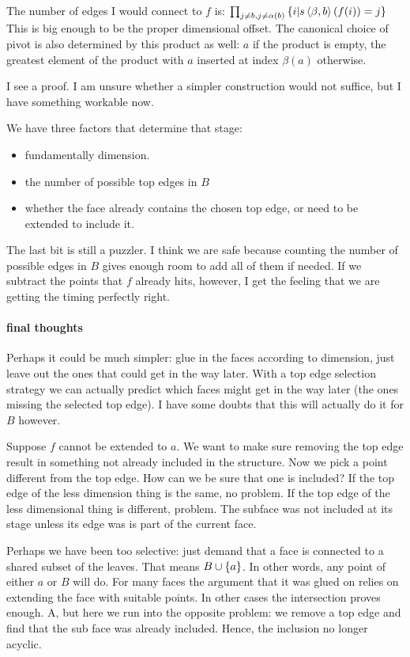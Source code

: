 \documentclass[csh.tex]{subfiles}
\begin{document}
The number of edges I would connect to $f$ is:
$\prod_{j\neq b, j\neq \alpha(b)}\left\{i|s\left\langle \beta,b \right\rangle(f(i)) = j\right\}$
This is big enough to be the proper dimensional offset.
The canonical choice of pivot is also determined by this product as well: $a$ if the product is empty, the greatest element of the product with $a$ inserted at index $\beta(a)$ otherwise.

I see a proof. I am unsure whether a simpler construction would not suffice, but I have something workable now.

We have three factors that determine that stage:
\begin{itemize}
\item fundamentally dimension.
\item the number of possible top edges in $B$
\item whether the face already contains the chosen top edge, or need to be extended to include it.
\end{itemize}
The last bit is still a puzzler. I think we are safe because counting the number of possible edges in $B$ gives enough room to add all of them if needed. If we subtract the points that $f$ already hits, however, I get the feeling that we are getting the timing perfectly right.

\paragraph{final thoughts}
Perhaps it could be much simpler: glue in the faces according to dimension, just leave out the ones that could get in the way later. With a top edge selection strategy we can actually predict which faces might get in the way later (the ones missing the selected top edge). I have some doubts that this will actually do it for $B$ however.

Suppose $f$ cannot be extended to $a$. We want to make sure removing the top edge result in something not already included in the structure. 
Now we pick a point different from the top edge. How can we be sure that one is included? If the top edge of the less dimension thing is the same, no problem. If the top edge of the less dimensional thing is different, problem. The subface was not included at its stage unless its edge was is part of the current face.

Perhaps we have been too selective: just demand that a face is connected to a shared subset of the leaves. That means $B\cup\left\{a\right\}$. In other words, any point of either $a$ or $B$ will do. For many faces the argument that it was glued on relies on extending the face with suitable points. In other cases the intersection proves enough. A, but here we run into the opposite problem: we remove a top edge and find that the sub face was already included. Hence, the inclusion no longer acyclic.
\end{document}

